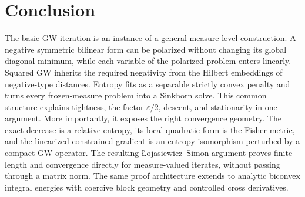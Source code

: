 \documentclass[11pt]{article}
\theoremstyle{definition}
\theoremstyle{remark}
\newcommand{\eps}{\varepsilon}
\begin{document}
\section{Conclusion}

The basic GW iteration is an instance of a general measure-level construction.
A negative symmetric bilinear form can be polarized without changing its
global diagonal minimum, while each variable of the polarized problem enters
linearly.  Squared GW inherits the required negativity from the Hilbert
embeddings of negative-type distances.  Entropy fits as a separable strictly
convex penalty and turns every frozen-measure problem into a Sinkhorn solve.
This common structure explains tightness, the factor \(\eps/2\), descent, and
stationarity in one argument.  More importantly, it exposes the right
convergence geometry.  The exact decrease is a relative entropy, its local
quadratic form is the Fisher metric, and the linearized constrained gradient
is an entropy isomorphism perturbed by a compact GW operator.  The resulting
{\L}ojasiewicz--Simon argument proves finite length and convergence directly
for measure-valued iterates, without passing through a matrix norm.  The same
proof architecture extends to analytic biconvex integral energies with
coercive block geometry and controlled cross derivatives.

\small
\setlength{\bibsep}{3pt plus 1pt minus 1pt}


\end{document}
